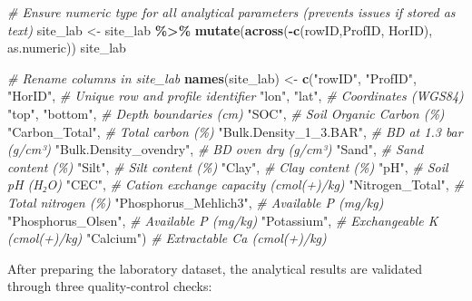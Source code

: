 \documentclass[
  10pt,
  b5paper,
  oneside]{book}
\newenvironment{Shaded}{\begin{snugshade}}{\end{snugshade}}
\newcommand{\CommentTok}[1]{\textcolor[rgb]{0.56,0.35,0.01}{\textit{#1}}}
\newcommand{\FunctionTok}[1]{\textcolor[rgb]{0.13,0.29,0.53}{\textbf{#1}}}
\newcommand{\NormalTok}[1]{#1}
\newcommand{\OtherTok}[1]{\textcolor[rgb]{0.56,0.35,0.01}{#1}}
\newcommand{\SpecialCharTok}[1]{\textcolor[rgb]{0.81,0.36,0.00}{\textbf{#1}}}
\newcommand{\StringTok}[1]{\textcolor[rgb]{0.31,0.60,0.02}{#1}}
\begin{document}
\begin{Shaded}
\begin{Highlighting}[]
  \CommentTok{\# Ensure numeric type for all analytical parameters (prevents issues if stored as text)}
\NormalTok{  site\_lab }\OtherTok{\textless{}{-}}\NormalTok{ site\_lab }\SpecialCharTok{\%\textgreater{}\%}
    \FunctionTok{mutate}\NormalTok{(}\FunctionTok{across}\NormalTok{(}\SpecialCharTok{{-}}\FunctionTok{c}\NormalTok{(rowID,ProfID, HorID), as.numeric))}
\NormalTok{site\_lab}

  \CommentTok{\# Rename columns in site\_lab}
  \FunctionTok{names}\NormalTok{(site\_lab) }\OtherTok{\textless{}{-}}
  \FunctionTok{c}\NormalTok{(}\StringTok{"rowID"}\NormalTok{, }\StringTok{"ProfID"}\NormalTok{, }\StringTok{"HorID"}\NormalTok{,      }\CommentTok{\# Unique row and profile identifier}
  \StringTok{"lon"}\NormalTok{, }\StringTok{"lat"}\NormalTok{,                      }\CommentTok{\# Coordinates (WGS84)}
  \StringTok{"top"}\NormalTok{, }\StringTok{"bottom"}\NormalTok{,                   }\CommentTok{\# Depth boundaries (cm)}
  \StringTok{"SOC"}\NormalTok{,                             }\CommentTok{\# Soil Organic Carbon (\%)}
  \StringTok{"Carbon\_Total"}\NormalTok{,                    }\CommentTok{\# Total carbon (\%)}
  \StringTok{"Bulk.Density\_1\_3.BAR"}\NormalTok{,            }\CommentTok{\# BD at 1.3 bar (g/cm³)}
  \StringTok{"Bulk.Density\_ovendry"}\NormalTok{,            }\CommentTok{\# BD oven dry (g/cm³)}
  \StringTok{"Sand"}\NormalTok{,                            }\CommentTok{\# Sand content (\%)}
  \StringTok{"Silt"}\NormalTok{,                            }\CommentTok{\# Silt content (\%)}
  \StringTok{"Clay"}\NormalTok{,                            }\CommentTok{\# Clay content (\%)}
  \StringTok{"pH"}\NormalTok{,                              }\CommentTok{\# Soil pH (H₂O)}
  \StringTok{"CEC"}\NormalTok{,                             }\CommentTok{\# Cation exchange capacity (cmol(+)/kg)}
  \StringTok{"Nitrogen\_Total"}\NormalTok{,                  }\CommentTok{\# Total nitrogen (\%)}
  \StringTok{"Phosphorus\_Mehlich3"}\NormalTok{,             }\CommentTok{\# Available P (mg/kg)}
  \StringTok{"Phosphorus\_Olsen"}\NormalTok{,                }\CommentTok{\# Available P (mg/kg)}
  \StringTok{"Potassium"}\NormalTok{,                       }\CommentTok{\# Exchangeable K (cmol(+)/kg)}
  \StringTok{"Calcium"}\NormalTok{)                         }\CommentTok{\# Extractable Ca (cmol(+)/kg)}
\end{Highlighting}
\end{Shaded}

After preparing the laboratory dataset, the analytical results are validated through three quality-control checks:
\end{document}
